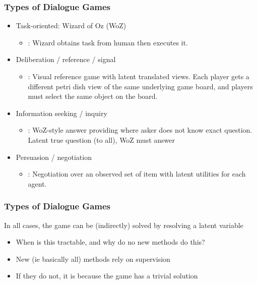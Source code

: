 \documentclass{beamer}
\begin{document}
\begin{frame}
\frametitle{Types of Dialogue Games}
\begin{itemize}

\item Task-oriented: Wizard of Oz (WoZ)
    \begin{itemize}
    \item \citet{tseng2019semisupdialogue}: Wizard obtains
        task from human then executes it.
    \end{itemize}
\item Deliberation / reference / signal
    \begin{itemize}
    \item \citet{udagawa2019oc}: Visual reference game
        with latent translated views.
        Each player gets a different petri dish view
        of the same underlying game board, and players must
        select the same object on the board.
    \end{itemize}
\item Information seeking / inquiry
    \begin{itemize}
    \item \citet{yu2019questions}: WoZ-style answer providing
        where asker does not know exact question.
        Latent true question (to all), WoZ must answer
    \end{itemize}
\item Persuasion / negotiation
    \begin{itemize}
    \item \citet{lewis2017dnd}: Negotiation over an observed
        set of item with latent utilities for each agent.
    \end{itemize}
\end{itemize}
\end{frame}

\begin{frame}
\frametitle{Types of Dialogue Games}
In all cases, the game can be (indirectly) solved by resolving a latent variable

\begin{itemize}
\item When is this tractable, and why do no new methods do this?
\item New (ie basically all) methods rely on supervision
\item If they do not, it is because the game has a trivial solution
\end{itemize}
\end{frame}
\end{document}
